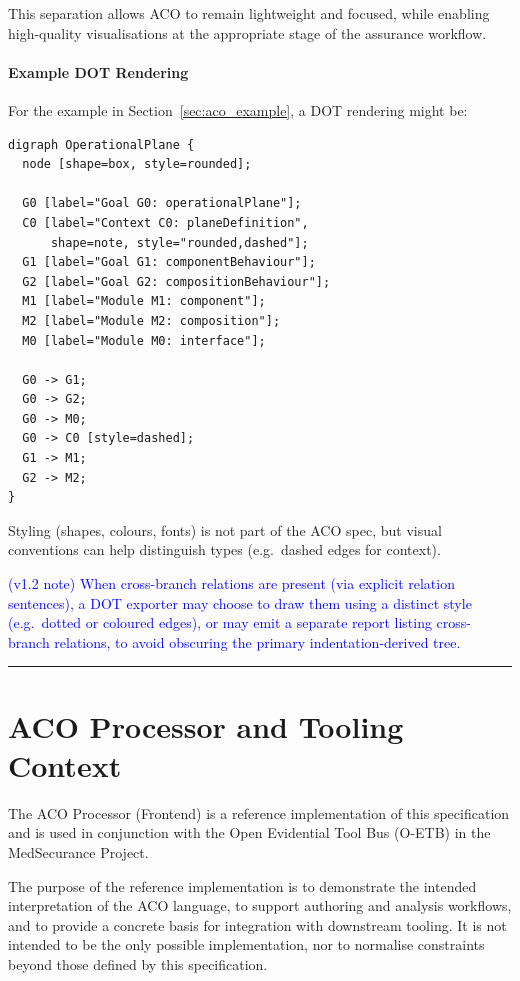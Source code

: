 \documentclass[11pt,twoside,a4paper]{article}
\begin{document}
This separation allows ACO to remain lightweight and focused, while enabling
high-quality visualisations at the appropriate stage of the assurance workflow.

\paragraph*{Example DOT Rendering}

For the example in Section~\ref{sec:aco_example}, a DOT rendering might be:

\begin{verbatim}
digraph OperationalPlane {
  node [shape=box, style=rounded];

  G0 [label="Goal G0: operationalPlane"];
  C0 [label="Context C0: planeDefinition",
      shape=note, style="rounded,dashed"];
  G1 [label="Goal G1: componentBehaviour"];
  G2 [label="Goal G2: compositionBehaviour"];
  M1 [label="Module M1: component"];
  M2 [label="Module M2: composition"];
  M0 [label="Module M0: interface"];

  G0 -> G1;
  G0 -> G2;
  G0 -> M0;
  G0 -> C0 [style=dashed];
  G1 -> M1;
  G2 -> M2;
}
\end{verbatim}

Styling (shapes, colours, fonts) is not part of the ACO spec, but visual conventions can help distinguish types (e.g.\ dashed edges for context).

\textcolor{blue}{(v1.2 note) When cross-branch relations are present (via explicit relation sentences), a DOT exporter may choose to draw them using a distinct style (e.g.\ dotted or coloured edges), or may emit a separate report listing cross-branch relations, to avoid obscuring the primary indentation-derived tree.}

\bigskip
\hrule
\bigskip



\section{ACO Processor and Tooling Context}
\label{sec:frontend}

The ACO Processor (Frontend) is a reference implementation of this specification and is used in
conjunction with the Open Evidential Tool Bus (O-ETB) in the MedSecurance Project.

The purpose of the reference implementation is to demonstrate the intended interpretation
of the ACO language, to support authoring and analysis workflows, and to provide a
concrete basis for integration with downstream tooling. It is not intended to be the
only possible implementation, nor to normalise constraints beyond those defined by this
specification.
\end{document}
